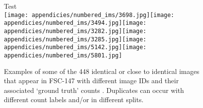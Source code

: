 \documentclass[letterpaper, 11pt]{IEEEtran}
\begin{document}
\begin{figure*}[!ht]
Test \\ \vspace{0.25em}
\texttt{[image: appendicies/numbered\_ims/3698.jpg]}\texttt{[image: appendicies/numbered\_ims/3494.jpg]}\texttt{[image: appendicies/numbered\_ims/3282.jpg]}\texttt{[image: appendicies/numbered\_ims/3285.jpg]}\texttt{[image: appendicies/numbered\_ims/5142.jpg]}\texttt{[image: appendicies/numbered\_ims/5801.jpg]}     \caption{Examples of some of the 448 identical or close to identical images that appear in FSC-147 with different image IDs and their associated `ground truth' counts . Duplicates can occur with different count labels and/or in different splits.}
    \label{subset_dupes}
\end{figure*}
\end{document}
